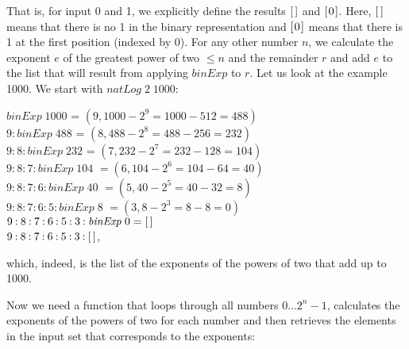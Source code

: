 \documentclass{scrreprt}
\newcommand{\Varid}[1]{\mathit{#1}}
\begin{document}
That is, for input 0 and 1,
we explicitly define the results \ensuremath{[\mskip1.5mu \mskip1.5mu]}
and \ensuremath{[\mskip1.5mu \mathrm{0}\mskip1.5mu]}.
Here, \ensuremath{[\mskip1.5mu \mskip1.5mu]} means that
there is no 1 in the binary representation
and \ensuremath{[\mskip1.5mu \mathrm{0}\mskip1.5mu]} means that
there is 1 at the first position (indexed by 0).
For any other number $n$,
we calculate the exponent $e$ 
of the greatest power of two $\le n$
and the remainder $r$ and add $e$
to the list that will result from
applying $binExp$ to $r$.
Let us look at the example \num{1000}.
We start with \ensuremath{\Varid{natLog}\;\mathrm{2}\;\mathrm{1000}}:

\ensuremath{\Varid{binExp}\;\mathrm{1000}} = $(9, 1000 - 2^9 = 1000 - 512 = 488)$\\
\ensuremath{\mathrm{9}\mathbin{:}\Varid{binExp}\;\mathrm{488}} = $(8, 488 - 2^8 = 488 - 256 = 232)$\\
\ensuremath{\mathrm{9}\mathbin{:}\mathrm{8}\mathbin{:}\Varid{binExp}\;\mathrm{232}} = $(7, 232 - 2^7 = 232 - 128 = 104)$\\
\ensuremath{\mathrm{9}\mathbin{:}\mathrm{8}\mathbin{:}\mathrm{7}\mathbin{:}\Varid{binExp}\;\mathrm{104}} $ = (6, 104 - 2^6 = 104 - 64 = 40)$\\
\ensuremath{\mathrm{9}\mathbin{:}\mathrm{8}\mathbin{:}\mathrm{7}\mathbin{:}\mathrm{6}\mathbin{:}\Varid{binExp}\;\mathrm{40}} $ = (5, 40 - 2^5 = 40 - 32 = 8)$\\
\ensuremath{\mathrm{9}\mathbin{:}\mathrm{8}\mathbin{:}\mathrm{7}\mathbin{:}\mathrm{6}\mathbin{:}\mathrm{5}\mathbin{:}\Varid{binExp}\;\mathrm{8}} $ = (3, 8 - 2^3 = 8 - 8 = 0)$\\
\ensuremath{\mathrm{9}\mathbin{:}\mathrm{8}\mathbin{:}\mathrm{7}\mathbin{:}\mathrm{6}\mathbin{:}\mathrm{5}\mathbin{:}\mathrm{3}\mathbin{:}\Varid{binExp}\;\mathrm{0}\mathrel{=}[\mskip1.5mu \mskip1.5mu]}\\
\ensuremath{\mathrm{9}\mathbin{:}\mathrm{8}\mathbin{:}\mathrm{7}\mathbin{:}\mathrm{6}\mathbin{:}\mathrm{5}\mathbin{:}\mathrm{3}\mathbin{:}[\mskip1.5mu \mskip1.5mu]},

which, indeed, is the list of the exponents
of the powers of two that add up to \num{1000}.

Now we need a function
that loops through all numbers $0 \dots 2^n-1$,
calculates the exponents of the powers of two for each number
and then retrieves the elements in the input set
that corresponds to the exponents:
\end{document}
